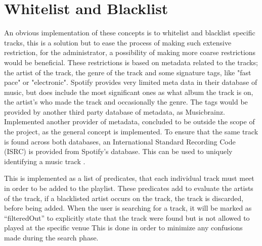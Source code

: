 \section{Whitelist and Blacklist}

An obvious implementation of these concepts is to whitelist and blacklist specific tracks, this is a solution but to ease the process of making such extensive restriction, for the administrator, a possibility of making more coarse restrictions would be beneficial. These restrictions is based on metadata related to the tracks; the artist of the track, the genre of the track and some signature tags, like "fast pace" or "electronic". Spotify provides very limited meta data in their database of music, but does include the most significant ones as what album the track is on, the artist's who made the track and occasionally the genre. The tags would be provided by another third party database of metadata, as Musicbrainz. Implemented another provider of metadata, concluded to be outside the scope of the project, as the general concept is implemented. To ensure that the same track is found across both databases, an International Standard Recording Code (ISRC) is provided from Spotify’s database. This can be used to uniquely identifying a music track \cite{isrc}.

This is implemented as a list of predicates, that each individual track must meet in order to be added to the playlist. These predicates add to evaluate the artists of the track, if a blacklisted artist occurs on the track, the track is discarded, before being added. When the user is searching for a track, it will be marked as \enquote{filteredOut} to explicitly state that the track were found but is not allowed to played at the specific venue This is done in order to minimize any confusions made during the search phase.
